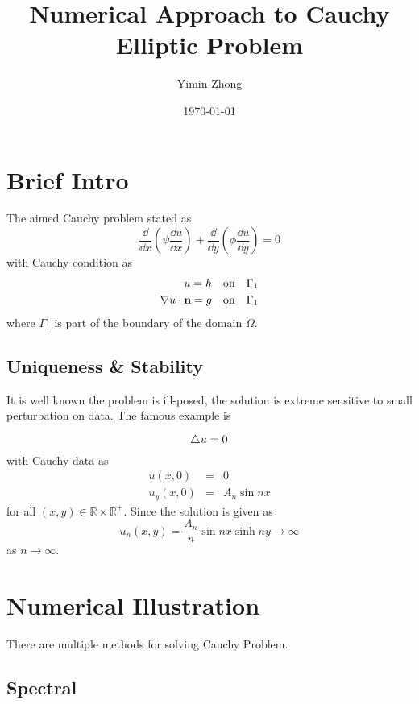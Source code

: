 \documentclass{note}
\author{Yimin Zhong}
\title{Numerical Approach to Cauchy Elliptic Problem}
\date{\today}
\begin{document}
\maketitle
\section{Brief Intro}
The aimed Cauchy problem stated as
\begin{equation}
\frac{\dd}{\dd x}\left(\psi \frac{\dd u}{\dd x}\right) + \frac{\dd}{\dd y}\left(\phi \frac{\dd u}{\dd y}\right) = 0
\end{equation}
with Cauchy condition as
\begin{eqnarray}
u  = h \quad\mbox{on}\quad \Gamma_1 \\
\nabla u \cdot \mathbf{n} = g \quad\mbox{on}\quad \Gamma_1
\end{eqnarray}
where $\Gamma_1$ is part of the boundary of the domain $\Omega$.
\subsection{Uniqueness \& Stability}
It is well known the problem is ill-posed, the solution is extreme sensitive to small perturbation on data. The famous example is
\begin{example}
\begin{equation}
\triangle u = 0
\end{equation}
with Cauchy data as
\begin{eqnarray}
u(x,0) &=& 0 \\
u_y(x,0) &=& A_n\sin nx 
\end{eqnarray}
for all $(x,y)\in \mathbb{R}\times\mathbb{R^{+}}$. Since the solution is given as
\begin{equation}
u_n(x,y) = \frac{A_n}{n}\sin nx \sinh ny \to\infty 
\end{equation}
as $n\to \infty$.
\end{example}

\section{Numerical Illustration}
There are multiple methods for solving Cauchy Problem.
\subsection{Spectral}
\end{document}
